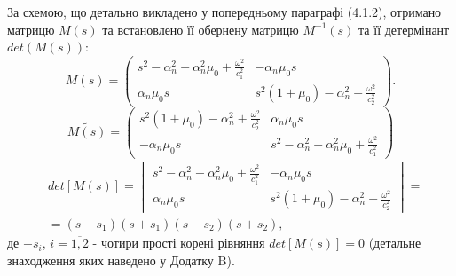 За схемою, що детально викладено у попередньому параграфі (4.1.2), отримано матрицю $M(s)$ та встановлено її обернену матрицю $M^{-1}(s)$ та її детермінант $det(M(s))$:
\begin{equation}
    M(s) = \begin{pmatrix}
        s^2 - \alpha_n^2 - \alpha_n^2\mu_0 + \frac{\omega^2}{c_1^2} & -\alpha_n \mu_0 s \\
        \alpha_n \mu_0 s & s^2 (1 + \mu_0) -\alpha_n^2 + \frac{\omega^2}{c_2^2}
     \end{pmatrix}.
\end{equation}
\begin{equation}
    \widetilde{M(s)} = \begin{pmatrix}
        s^2 (1 + \mu_0) -\alpha_n^2 + \frac{\omega^2}{c_2^2} & \alpha_n \mu_0 s \\
        -\alpha_n \mu_0 s & s^2 - \alpha_n^2 - \alpha_n^2\mu_0 + \frac{\omega^2}{c_1^2}
     \end{pmatrix}
\end{equation}
\begin{align}
    &det[M(s)] = \begin{vmatrix}
        s^2 - \alpha_n^2 - \alpha_n^2\mu_0 + \frac{\omega^2}{c_1^2} & -\alpha_n \mu_0 s \\
        \alpha_n \mu_0 s & s^2 (1 + \mu_0) -\alpha_n^2 + \frac{\omega^2}{c_2^2}
     \end{vmatrix} = \nonumber \\
    &=(s - s_1)(s + s_1)(s - s_2)(s + s_2),
\end{align}
де $\pm s_i$, $i=\overline{1, 2}$ - чотири прості корені рівняння $det[M(s)]=0$ (детальне знаходження яких наведено у Додатку B).


